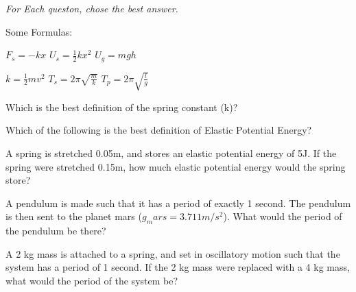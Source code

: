 \documentclass[11pt]{examdesign}
\begin{document}
\begin{multiplechoice} [title={Multiple Choice},
	rearrange=no]

\textit{For Each queston, chose the best answer.}

	Some Formulas: 
	\begin{center}
	$F_s = -kx$ \hspace {1in} $	U_s = \frac{1}{2}kx^2 $ \hspace{1in} 	$U_g = mgh$
	\vspace{0.1in}

$k = \frac{1}{2} m v^2$ \hspace{1in} $	T_s = 2 \pi \sqrt{\frac{m}{k}} $ \hspace{1in} $	T_p = 2 \pi \sqrt{\frac{l}{g}} $ 
	\vspace{0.1in}
	\end{center}	
	


\begin{question}
Which is the best definition of the spring constant (k)? 
\end{question}

\begin{question}
Which of the following is the best definition of Elastic Potential Energy?
\end{question}

\begin{question}
A spring is stretched 0.05m, and stores an elastic potential energy of 5J.  If the spring were stretched 0.15m, how much elastic potential energy would the spring store?


\end{question}


\begin{question}
	A pendulum is made such that it has a period of exactly 1 second.  The pendulum is then sent to the planet mars ($g_mars = 3.711 m/s^2$).  What would the period of the pendulum be there?
	
	
\end{question}

\begin{question}
A 2 kg mass is attached to a spring, and set in oscillatory motion such that the system has a period of 1 second.  If the 2 kg mass were replaced with a 4 kg mass, what would the period of the system be?
	
\end{question}


\end{multiplechoice} 
\end{document}
